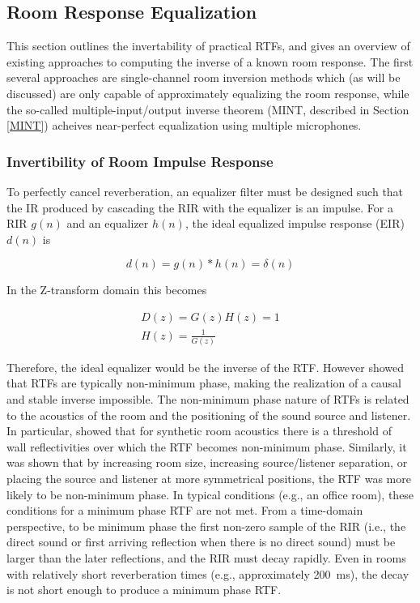 \subsection{Room Response Equalization}

This section outlines the invertability of practical RTFs, and gives an overview of existing approaches to computing the inverse of a known room response. The first several approaches are single-channel room inversion methods which (as will be discussed) are only capable of approximately equalizing the room response, while the so-called multiple-input/output inverse theorem (MINT, described in Section \ref{MINT}) acheives near-perfect equalization using multiple microphones.

\subsubsection{Invertibility of Room Impulse Response} \label{RIR_Invertibility}

To perfectly cancel reverberation, an equalizer filter must be designed such that the IR produced by cascading the RIR with the equalizer is an impulse. For a RIR $g(n)$ and an equalizer $h(n)$, the ideal equalized impulse response (EIR) $d(n)$  is

\begin{equation} 
d(n)=g(n)*h(n)=\delta(n)
\end{equation}

\noindent
In the Z-transform domain this becomes

\noindent
\begin{eqnarray}
D(z)=G(z)H(z)=1	\\
H(z)=\frac{1}{G(z)}
\end{eqnarray}

Therefore, the ideal equalizer would be the inverse of the RTF. However \cite{neely1979invertibility} showed that RTFs are typically non-minimum phase, making the realization of a causal and stable inverse impossible. The non-minimum phase nature of RTFs is related to the acoustics of the room and the positioning of the sound source and listener. In particular, \cite{neely1979invertibility} showed that for synthetic room acoustics there is a threshold of wall reflectivities over which the RTF becomes non-minimum phase. Similarly, it was shown that by increasing room size, increasing source/listener separation, or placing the source and listener at more symmetrical positions, the RTF was more likely to be non-minimum phase. In typical conditions (e.g., an office room), these conditions for a minimum phase RTF are not met. From a time-domain perspective, to be minimum phase the first non-zero sample of the RIR (i.e., the direct sound or first arriving reflection when there is no direct sound) must be larger than the later reflections, and the RIR must decay rapidly. Even in rooms with relatively short reverberation times (e.g., approximately \qty{200}{\milli\second}), the decay is not short enough to produce a minimum phase RTF.

